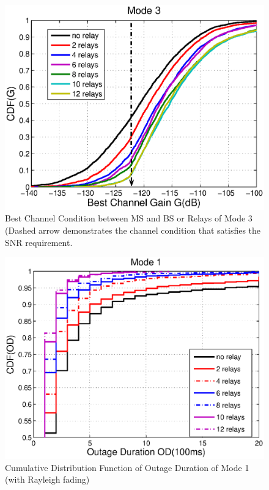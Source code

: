 \begin{figure}
\centering
\includegraphics[width=12cm]{Mode3_bestchannelgain_V2.eps}
\caption{Best Channel Condition between MS and BS or Relays of Mode 3 (Dashed arrow demonstrates the channel condition that satisfies the SNR requirement.}
\label{Mode3}
\end{figure}
\begin{figure}
\centering
\includegraphics[width=12cm]{OutageDuration_Rayleigh_Mode1_V2.eps}
\caption{Cumulative Distribution Function of Outage Duration of Mode 1 (with Rayleigh fading)}
\label{Mode1Out}
\end{figure}
